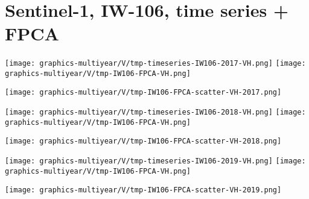 
\section{Sentinel-1, IW-106, time series + FPCA}
\setcounter{theorem}{0}

\renewcommand{\theenumi}{\roman{enumi}}
\renewcommand{\labelenumi}{\textnormal{(\theenumi)}$\;\;$}


\begin{center}
\begin{minipage}{7.0in}
\texttt{[image: graphics-multiyear/V/tmp-timeseries-IW106-2017-VH.png]}
\quad
\texttt{[image: graphics-multiyear/V/tmp-IW106-FPCA-VH.png]}
\vskip 1.0cm
\begin{center}
\texttt{[image: graphics-multiyear/V/tmp-IW106-FPCA-scatter-VH-2017.png]}
\end{center}
\end{minipage}
\end{center}


\begin{center}
\begin{minipage}{7.0in}
\texttt{[image: graphics-multiyear/V/tmp-timeseries-IW106-2018-VH.png]}
\quad
\texttt{[image: graphics-multiyear/V/tmp-IW106-FPCA-VH.png]}
\vskip 1.0cm
\begin{center}
\texttt{[image: graphics-multiyear/V/tmp-IW106-FPCA-scatter-VH-2018.png]}
\end{center}
\end{minipage}
\end{center}


\begin{center}
\begin{minipage}{7.0in}
\texttt{[image: graphics-multiyear/V/tmp-timeseries-IW106-2019-VH.png]}
\quad
\texttt{[image: graphics-multiyear/V/tmp-IW106-FPCA-VH.png]}
\vskip 1.0cm
\begin{center}
\texttt{[image: graphics-multiyear/V/tmp-IW106-FPCA-scatter-VH-2019.png]}
\end{center}
\end{minipage}
\end{center}

